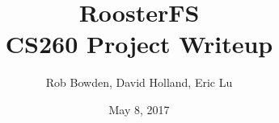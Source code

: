 \documentclass[10pt, twocolumn, letterpaper]{article}
\title{RoosterFS \\ {\Large CS260 Project Writeup}}
\author{Rob Bowden, David Holland, Eric Lu}
\date{May 8, 2017}
\begin{document}
\maketitle




{
\footnotesize


}
\end{document}
